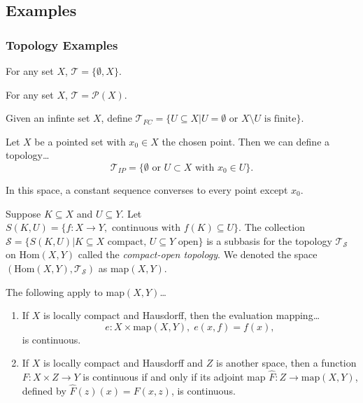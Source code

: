 \subsection{Examples}

\subsubsection{Topology Examples}\label{exampletopologies}

\label{indiscretetopology}

For any set $X$, $\mathcal{T} = \{\emptyset, X\}$.

\label{discretetopology}

For any set $X$, $\mathcal{T} = \mathcal{P}(X)$.

\label{finitecomplementtopology}

Given an infinte set $X$, define $\mathcal{T}_{FC} = \{U \subseteq X | U = \emptyset \textrm{ or } X \setminus U \textrm{ is finite}\}$.

\label{includedpointtopology}
Let $X$ be a pointed set with $x_0 \in X$ the chosen point. Then we can define a topology\dots
$$\mathcal{T}_{IP} = \{ \emptyset \textrm{ or } U \subset X \textrm{ with } x_0 \in U \}.$$

\noindent In this space, a constant sequence converses to every point except $x_0$.

\label{compactopentopology}
Suppose $K \subseteq X$ and $U \subseteq Y$. Let $S(K,U) = \{f : X \rightarrow Y, \textrm{ continuous with } f(K) \subseteq U \}$. The collection
$\mathcal{S} = \{ S(K,U) | K \subseteq X \textrm{ compact, } U \subseteq Y \textrm{ open} \}$ is a subbasis for the topology $\mathcal{T}_{\mathcal{S}}$
on Hom$(X,Y)$ called the \emph{compact-open topology}. We denoted the space $(\textrm{Hom}(X,Y),\mathcal{T}_{\mathcal{S}})$ as map$(X,Y)$.

\begin{theorem}
The following apply to map$(X,Y)$\dots
\begin{enumerate}
  \item If $X$ is locally compact and Hausdorff, then the evaluation mapping\dots
  $$e: X \times \textrm{map}(X,Y), \; e(x,f) = f(x),$$
  is continuous.
  \item If $X$ is locally compact and Hausdorff and $Z$ is another space, then a function $F : X \times Z \rightarrow Y$ is continuous if and only if its
  adjoint map $\hat{F} : Z \rightarrow \textrm{map}(X,Y)$, defined by $\hat{F}(z)(x) = F(x,z)$, is continuous.
\end{enumerate}
\end{theorem}

